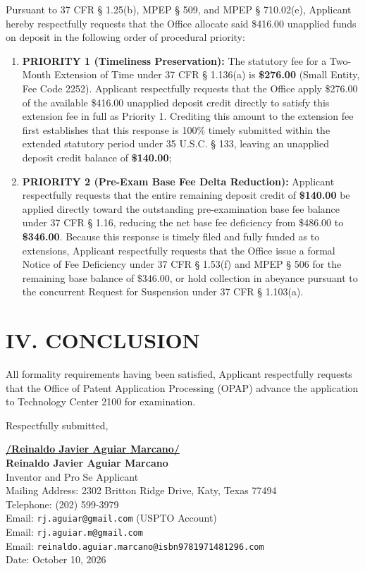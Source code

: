 \documentclass[11pt,letterpaper]{article}
\begin{document}
Pursuant to 37 CFR \S{} 1.25(b), MPEP \S{} 509, and MPEP \S{} 710.02(e), Applicant hereby respectfully requests that the Office allocate said \$416.00 unapplied funds on deposit in the following order of procedural priority:
\begin{enumerate}[leftmargin=*]
    \item \textbf{PRIORITY 1 (Timeliness Preservation):} The statutory fee for a Two-Month Extension of Time under 37 CFR \S{} 1.136(a) is \textbf{\$276.00} (Small Entity, Fee Code 2252). Applicant respectfully requests that the Office apply \$276.00 of the available \$416.00 unapplied deposit credit directly to satisfy this extension fee in full as Priority 1. Crediting this amount to the extension fee first establishes that this response is 100\% timely submitted within the extended statutory period under 35 U.S.C. \S{} 133, leaving an unapplied deposit credit balance of \textbf{\$140.00};
    \item \textbf{PRIORITY 2 (Pre-Exam Base Fee Delta Reduction):} Applicant respectfully requests that the entire remaining deposit credit of \textbf{\$140.00} be applied directly toward the outstanding pre-examination base fee balance under 37 CFR \S{} 1.16, reducing the net base fee deficiency from \$486.00 to \textbf{\$346.00}. Because this response is timely filed and fully funded as to extensions, Applicant respectfully requests that the Office issue a formal Notice of Fee Deficiency under 37 CFR \S{} 1.53(f) and MPEP \S{} 506 for the remaining base balance of \$346.00, or hold collection in abeyance pursuant to the concurrent Request for Suspension under 37 CFR \S{} 1.103(a).
\end{enumerate}

\section*{IV. CONCLUSION}

All formality requirements having been satisfied, Applicant respectfully requests that the Office of Patent Application Processing (OPAP) advance the application to Technology Center 2100 for examination.

\vspace{0.6cm}
\begin{singlespace}
\noindent Respectfully submitted, \par\vspace{0.8cm}
\underline{\textbf{/Reinaldo Javier Aguiar Marcano/}} \\
\textbf{Reinaldo Javier Aguiar Marcano} \\
Inventor and Pro Se Applicant \\
Mailing Address: 2302 Britton Ridge Drive, Katy, Texas 77494 \\
Telephone: (202) 599-3979 \\
Email: \texttt{rj.aguiar@gmail.com} (USPTO Account) \\
Email: \texttt{rj.aguiar.m@gmail.com} \\
Email: \texttt{reinaldo.aguiar.marcano@isbn9781971481296.com} \\
Date: October 10, 2026
\end{singlespace}
\end{document}
